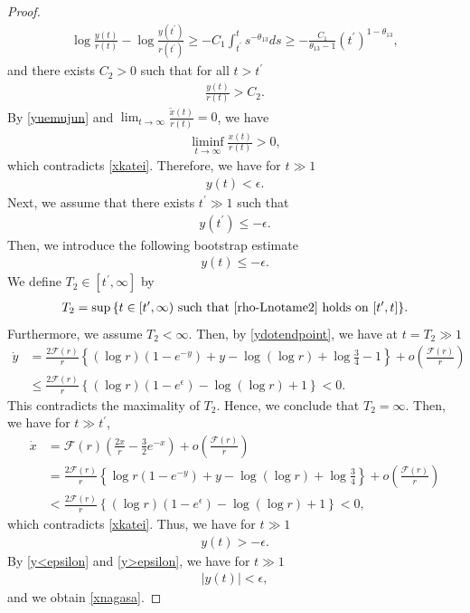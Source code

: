 \documentclass[10pt,a4paper]{amsart}
\numberwithin{equation}{section}
\begin{document}
\begin{proof}
\begin{align*}
\log{\frac{y(t)}{r(t)}}-\log{\frac{y(t^{\prime})}{r(t^{\prime})}}\geq -C_1\int_{t^{\prime}}^ts^{-\theta_{13}}ds\geq -\frac{C_1}{\theta_{13}-1}\left(t^{\prime}\right)^{1-\theta_{13}},
\end{align*}
and there exists $C_2>0$ such that for all $t>t^{\prime}$
\begin{align}\label{yuemujun}
\frac{y(t)}{r(t)}>C_2.
\end{align}
By \eqref{yuemujun} and $\lim_{t\to\infty}\frac{\tilde{x}(t)}{r(t)}=0$, we have
\begin{align*}
\liminf_{t\to\infty}\frac{x(t)}{r(t)}>0,
\end{align*}
which contradicts \eqref{xkatei}. Therefore, we have for $t\gg 1$
\begin{align}\label{y<epsilon}
y(t)<\epsilon.
\end{align}
Next, we assume that there exists 
$t^{\prime}\gg1$ such that
\begin{align*}
y(t^{\prime})\leq-\epsilon.
\end{align*}
Then, we introduce the following bootstrap estimate
\begin{align}\label{rho-Lnotame2}
y(t)\leq -\epsilon.
\end{align}
We define $T_2\in [t^{\prime},\infty]$ by
\begin{align}\label{ylowerexit}
T_2=\sup{\{t\in[t^{\prime},\infty)\ \mbox{such that}\ \eqref{rho-Lnotame2}\ \mbox{holds on}\ [t^{\prime},t] \}}.
\end{align}
Furthermore, we assume $T_2<\infty$. Then, by \eqref{ydotendpoint}, we have at $t=T_2\gg 1$
\begin{align*}
\dot{y}&=\frac{2\mathcal{F}(r)}{r}\left\{\left(\log{r}\right)\left(1-e^{-y}\right)+y-\log{(\log{r})}+\log{\frac{3}{4}}-1\right\}+o\left(\frac{\mathcal{F}(r)}{r}\right)
\\
&\leq \frac{2\mathcal{F}(r)}{r}\left\{\left(\log{r}\right)\left(1-e^{\epsilon}\right)-\log{(\log{r})}+1 \right\}<0.
\end{align*}
This contradicts the maximality of $T_2$. Hence, we conclude that $T_2=\infty$. Then, we have for $t\gg t^{\prime}$,
\begin{align*}
\dot{x}&=\mathcal{F}(r)\left(\frac{2x}{r}-\frac{3}{2}e^{-x}\right)+o\left(\frac{\mathcal{F}(r)}{r}\right)
\\
&=\frac{2\mathcal{F}(r)}{r}\left\{\log{r}\left(1-e^{-y}\right)+y-\log{(\log{r})}+\log{\frac{3}{4}}\right\}+o\left(\frac{\mathcal{F}(r)}{r}\right)
\\
&<\frac{2\mathcal{F}(r)}{r}\left\{\left(\log{r}\right)\left(1-e^{\epsilon}\right)-\log{(\log{r})}+1 \right\}<0,
\end{align*}
which contradicts \eqref{xkatei}. Thus, we have for $t\gg 1$
\begin{align}\label{y>epsilon}
y(t)>-\epsilon.
\end{align}
By \eqref{y<epsilon} and \eqref{y>epsilon}, we have for $t\gg 1$
\begin{align*}
|y(t)|<\epsilon,
\end{align*}
and we obtain \eqref{xnagasa}.
\end{proof}
\end{document}
